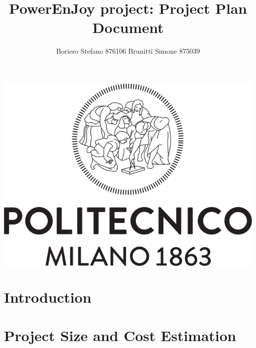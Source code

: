 \documentclass{article}
\begin{document}
\title{\textbf{{\Huge PowerEnJoy project: Project Plan Document}}}
\author{\begin{large}
Boriero Stefano  876106  
Brunitti Simone   875039
\end{large} }


\maketitle
\includegraphics[scale=0.5]{Logo_Politecnico_Milano.png} 
\newpage
\tableofcontents

\newpage

\section{Introduction}

\newpage
\section{Project Size and Cost Estimation}
\end{document}
